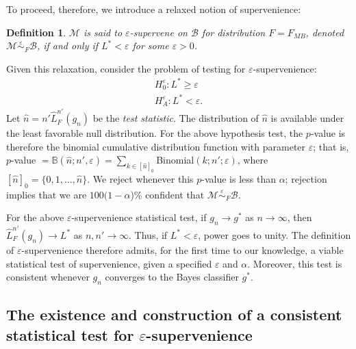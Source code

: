 \documentclass{article}
\newtheorem{defi}{Definition}
\providecommand{\mc}[1]{\mathcal{#1}}
\providecommand{\mh}[1]{\hat{#1}}
\newcommand{\eps}{\varepsilon}
\newcommand{\conv}{\rightarrow}
\newcommand{\mB}{\mathcal{B}}
\newcommand{\mM}{\mathcal{M}}
\newcommand{\hL}{\widehat{L}}
\newcommand{\MeB}{\mM \overset{\varepsilon}{{\sim}}_{F} \mB}
\begin{document}
To proceed, therefore, we introduce a relaxed notion of supervenience: 
\begin{defi}
\label{def:2}
$\mM$ is said to $\eps$-\textit{supervene} on $\mB$ for distribution $F=F_{MB}$, denoted $\MeB$, if and only if $L^*< \eps$ for some $\eps>0$.
\end{defi}
\noindent 
Given this relaxation, consider the problem of testing for $\eps$-supervenience:
\begin{align*}
	H_0^{\eps}: L^* \geq \eps \\
	H_A^{\eps}: L^* < \eps.
\end{align*}
Let $\mh{n}= n' \hL^{n'}_{F}(g_n)$ be the \emph{test statistic}. 
The distribution of $\mh{n}$ is available under the least favorable null distribution. 
For the above hypothesis test,  
the $p$-value is therefore the binomial cumulative distribution function with parameter $\eps$; that is, $p$-value $=\mathbb{B}(\mh{n}; n', \eps)= \sum_{k \in [\mh{n}]_0}$Binomial$(k; n'; \eps)$, where
$[\mh{n}]_0=\{0,1,\ldots, \mh{n}\}$.  We reject whenever this $p$-value is less than $\alpha$; rejection implies that we are $100(1-\alpha$)\% confident that $\MeB$.   

 For the above $\eps$-supervenience statistical test, if $g_n \conv g^*$ as $n \conv \infty$, then $\hL^{n'}_F(g_n) \conv L^*$ as $n,n' \conv \infty$.  Thus, if $L^* < \eps$, 
power goes to unity.
The definition of $\eps$-supervenience therefore admits, for the first time to our knowledge, a viable statistical test of supervenience, given a specified $\eps$ and $\alpha$. Moreover, this test is consistent whenever $g_n$ converges to the Bayes classifier $g^*$.





\subsection*{The existence and construction of a consistent statistical test for $\eps$-supervenience} %
\label{sub:uc}
\end{document}
